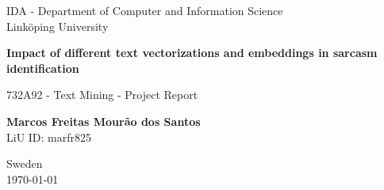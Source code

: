 \begin{titlepage}
\begin{center}
\vspace*{1cm}

\large
IDA - Department of Computer and Information Science\\
Linköping University

\vspace{5cm}

\LARGE
\textbf{Impact of different text vectorizations and embeddings in sarcasm identification}

\Large
732A92 - Text Mining - Project Report

\vspace{2cm}

\textbf{Marcos Freitas Mourão dos Santos}\\
LiU ID: marfr825

\vfill

Sweden\\
\today

\end{center}
\end{titlepage}